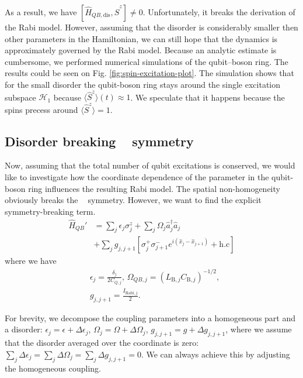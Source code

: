 \documentclass[reprint, aps, prx, amsmath, amssymb, longbibliography, superscriptaddress]{revtex4-2}
\DeclareMathOperator{\Zthree}{\mathbb{Z}_3}
\begin{document}
As a result, we have $[\hat H_{QB,\text{dis}}, \hat S^z] \neq 0 $. Unfortunately, it breaks the derivation of the Rabi model. However, assuming that the disorder is considerably smaller then other parameters in the Hamiltonian, we can still hope that the dynamics is approximately governed by the Rabi model. Because an analytic estimate is cumbersome, we performed numerical simulations of the qubit–boson ring. The results could be seen on Fig. \ref{fig:spin-excitation-plot}. The simulation shows that for the small disorder the qubit-boson ring stays around the single excitation subspace $\mathcal{H}_1$ because $\langle \hat S^z \rangle(t) \approx 1$. We speculate that it happens because the spins precess around $\langle \hat S^z \rangle = 1$.


\subsection{Disorder breaking \texorpdfstring{$\Zthree$}{Z3} symmetry}

Now, assuming that the total number of qubit excitations is conserved, we would like to investigate how the coordinate dependence of the parameter in the qubit-boson ring influences the resulting Rabi model. The spatial non-homogeneity obviously breaks the $\Zthree$ symmetry. However, we want to find the explicit symmetry-breaking term.
\begin{equation}
\label{rabi-breaking-disorder}
\begin{aligned}
  \hat H_{QB}' &= \sum_j \epsilon_{j} \sigma_j^z + \sum_j \Omega_j \hat a^{\dagger}_j \hat a_j  \\
  &+ \sum_j g_{j,j+1} \left[\sigma_j^+ \sigma_{j+1}^- e^{i (\hat x_j - \hat x_{j+1})} +\text{h.c}\right]
\end{aligned}
\end{equation}
where we have
\begin{equation}
\begin{aligned}
    &\epsilon_j = \frac{\delta_j}{2 C_{Q,j}},\,
    \Omega_{QB,j} = \left(L_{\text{B},j}C_{\text{B},j}\right)^{-1/2}, \\
    &g_{j,j+1} = \frac{I_{\text{Rabi},j}}{2}.
\end{aligned}
\end{equation}

For brevity, we decompose the coupling parameters into a homogeneous part and a disorder: $\epsilon_j = \epsilon + \Delta \epsilon_j$, $\Omega_j = \Omega + \Delta \Omega_j$, $g_{j,j+1} = g + \Delta g_{j,j+1}$, where we assume that the disorder averaged over the coordinate is zero: $\sum_j \Delta \epsilon_j =  \sum_j \Delta \Omega_j = \sum_j \Delta g_{j,j+1} =0$. We can always achieve this by adjusting the homogeneous coupling.
\end{document}
